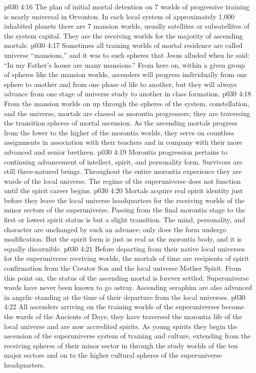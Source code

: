 \vs p030 4:16 \pc The plan of initial mortal detention on 7 worlds of progressive training is nearly universal in Orvonton. In each local system of approximately 1,000 inhabited planets there are 7 mansion worlds, usually satellites or subsatellites of the system capital. They are the receiving worlds for the majority of ascending mortals.
\vs p030 4:17 Sometimes all training worlds of mortal residence are called universe “mansions,” and it was to such spheres that Jesus alluded when he said: “In my Father’s house are many mansions.” From here on, within a given group of spheres like the mansion worlds, ascenders will progress individually from one sphere to another and from one phase of life to another, but they will always advance from one stage of universe study to another in class formation.
\vs p030 4:18 \bibnobreakspace {} From the mansion worlds on up through the spheres of the system, constellation, and the universe, mortals are classed as morontia progressors; they are traversing the transition spheres of mortal ascension. As the ascending mortals progress from the lower to the higher of the morontia worlds, they serve on countless assignments in association with their teachers and in company with their more advanced and senior brethren.
\vs p030 4:19 Morontia progression pertains to continuing advancement of intellect, spirit, and personality form. Survivors are still three\hyp{}natured beings. Throughout the entire morontia experience they are wards of the local universe. The regime of the superuniverse does not function until the spirit career begins.
\vs p030 4:20 Mortals acquire real spirit identity just before they leave the local universe headquarters for the receiving worlds of the minor sectors of the superuniverse. Passing from the final morontia stage to the first or lowest spirit status is but a slight transition. The mind, personality, and character are unchanged by such an advance; only does the form undergo modification. But the spirit form is just as real as the morontia body, and it is equally discernible.
\vs p030 4:21 Before departing from their native local universes for the superuniverse receiving worlds, the mortals of time are recipients of spirit confirmation from the Creator Son and the local universe Mother Spirit. From this point on, the status of the ascending mortal is forever settled. Superuniverse wards have never been known to go astray. Ascending seraphim are also advanced in angelic standing at the time of their departure from the local universes.
\vs p030 4:22 \bibnobreakspace {} All ascenders arriving on the training worlds of the superuniverses become the wards of the Ancients of Days; they have traversed the morontia life of the local universe and are now accredited spirits. As young spirits they begin the ascension of the superuniverse system of training and culture, extending from the receiving spheres of their minor sector in through the study worlds of the ten major sectors and on to the higher cultural spheres of the superuniverse headquarters.
